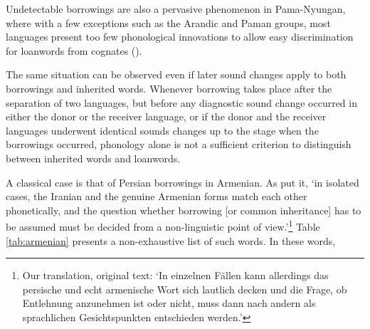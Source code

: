 \documentclass[svgnames,12pt]{scrartcl}
\newcommand{\ipa}[1]{{{\phon\mbox{#1}}}}
\begin{document}
{{%

Undetectable borrowings are also a pervasive phenomenon in Pama-Nyungan, where with a few exceptions such as the Arandic and Paman groups, most languages present too few phonological innovations to allow easy discrimination for loanwords from cognates (\citealt[46]{koch04method}).

The same situation can be observed even if later sound changes apply to both borrowings and inherited words. Whenever borrowing takes place after the separation of two languages, but before any diagnostic sound change occurred in either the donor or the receiver language, or if the donor and the receiver languages underwent identical sounds changes up to the stage when the borrowings occurred, phonology alone is not a sufficient criterion to distinguish between inherited words and loanwords. 
 
A classical case is that of Persian borrowings in Armenian. As
\citet[16-17]{huebschmann97armenische} put it, `in isolated cases, the Iranian and the genuine Armenian forms match each other phonetically, and the question whether borrowing [or common inheritance] has to be assumed must be decided from a non-linguistic point of view.'\footnote{Our
translation, original text: `In einzelnen Fällen kann allerdings das persische und echt armenische Wort sich lautlich decken und die Frage, ob Entlehnung anzunehmen ist oder nicht, muss dann nach andern als sprachlichen Gesichtspunkten entschieden werden.'} Table \ref{tab:armenian} presents a non-exhaustive list of such words. In these words, 
 
}}
\end{document}
